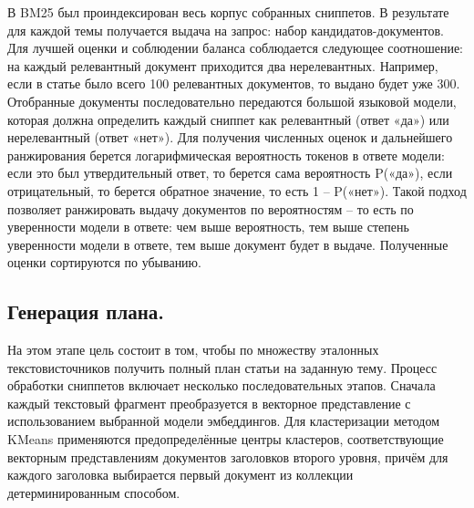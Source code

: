 \documentclass{article}
\theoremstyle{definition}
\theoremstyle{plain}
\begin{document}
В BM25 был проиндексирован весь корпус собранных сниппетов. В результате для каждой темы получается выдача на запрос: набор кандидатов-документов. Для лучшей оценки и соблюдении баланса соблюдается следующее соотношение: на каждый релевантный документ приходится два нерелевантных. Например, если в статье было всего 100 релевантных документов, то выдано будет уже 300. Отобранные документы последовательно передаются большой языковой модели, которая должна определить каждый сниппет как релевантный (ответ «да») или нерелевантный (ответ «нет»). Для получения численных оценок и дальнейшего ранжирования берется логарифмическая вероятность токенов в ответе модели: если это был утвердительный ответ, то берется сама вероятность P(«да»), если отрицательный, то берется обратное значение, то есть 1 – P(«нет»). 
Такой подход позволяет ранжировать выдачу документов по вероятностям – то есть по уверенности модели в ответе: чем выше вероятность, тем выше степень уверенности модели в ответе, тем выше документ будет в выдаче. Полученные оценки сортируются по убыванию. 

\subsection*{Генерация плана.}

На этом этапе цель состоит в том, чтобы по множеству эталонных текстов\-источников получить полный план статьи на заданную тему.
Процесс обработки сниппетов включает несколько последовательных этапов. 
Сначала каждый текстовый фрагмент преобразуется в векторное представление с использованием выбранной модели эмбеддингов. 
Для кластеризации методом KMeans применяются предопределённые центры кластеров, соответствующие векторным представлениям документов заголовков второго уровня, причём для каждого заголовка выбирается первый документ из коллекции детерминированным способом. 
\end{document}
